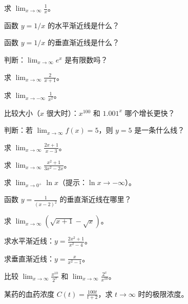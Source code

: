 \begin{exercise}[0]
求 \(\displaystyle\lim_{x\to\infty} \frac{1}{x}\)。
\end{exercise}
\begin{exercise}[0]
函数 \(y=1/x\) 的水平渐近线是什么？
\end{exercise}
\begin{exercise}[0]
函数 \(y=1/x\) 的垂直渐近线是什么？
\end{exercise}
\begin{exercise}[0]
判断：\(\displaystyle\lim_{x\to\infty} e^x\) 是有限数吗？
\end{exercise}

\begin{exercise}[1]
求 \(\displaystyle\lim_{x\to\infty} \frac{2}{x+1}\)。
\end{exercise}
\begin{exercise}[1]
求 \(\displaystyle\lim_{x\to-\infty} \frac{1}{x^2}\)。
\end{exercise}
\begin{exercise}[1]
比较大小（\(x\) 很大时）：\(x^{100}\) 和 \(1.001^x\) 哪个增长更快？
\end{exercise}
\begin{exercise}[1]
判断：若 \(\lim_{x\to\infty} f(x)=5\)，则 \(y=5\) 是一条什么线？
\end{exercise}

\begin{exercise}[2]
求 \(\displaystyle\lim_{x\to\infty} \frac{2x+1}{x-3}\)。
\end{exercise}
\begin{exercise}[2]
求 \(\displaystyle\lim_{x\to\infty} \frac{x^2+1}{3x^2-2x}\)。
\end{exercise}
\begin{exercise}[2]
求 \(\displaystyle\lim_{x\to 0^+} \ln x\)（提示：\(\ln x \to -\infty\)）。
\end{exercise}
\begin{exercise}[2]
函数 \(y=\frac{1}{(x-2)^2}\) 的垂直渐近线在哪里？
\end{exercise}

\begin{exercise}[3]
求 \(\displaystyle\lim_{x\to\infty} (\sqrt{x+1}-\sqrt{x})\)。
\end{exercise}
\begin{exercise}[3]
求水平渐近线：\(y=\frac{2x^2+1}{x^2-4}\)。
\end{exercise}
\begin{exercise}[3]
求垂直渐近线：\(y=\frac{x}{x^2-1}\)。
\end{exercise}
\begin{exercise}[3]
比较 \(\lim_{x\to\infty} \frac{x^{10}}{2^x}\) 和 \(\lim_{x\to\infty} \frac{2^x}{x^{10}}\)。
\end{exercise}
\begin{exercise}[3]
某药的血药浓度 \(C(t)=\frac{100t}{t+2}\)，求 \(t\to\infty\) 时的极限浓度。
\end{exercise}

